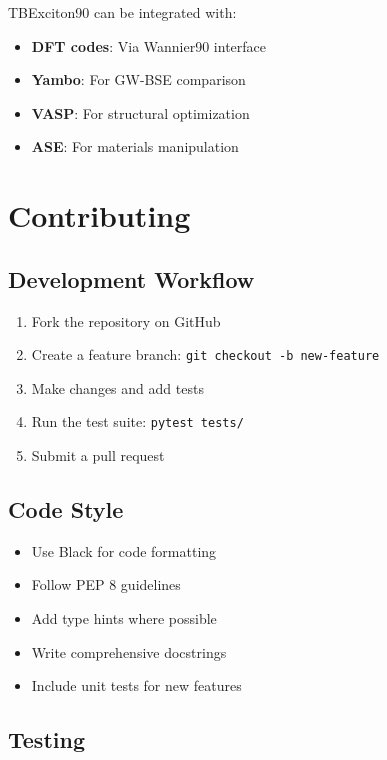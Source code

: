 \documentclass[11pt,a4paper]{article}
\newcommand{\code}[1]{\texttt{#1}}
\begin{document}
TBExciton90 can be integrated with:

\begin{itemize}
    \item \textbf{DFT codes}: Via Wannier90 interface
    \item \textbf{Yambo}: For GW-BSE comparison
    \item \textbf{VASP}: For structural optimization
    \item \textbf{ASE}: For materials manipulation
\end{itemize}

\section{Contributing}

\subsection{Development Workflow}

\begin{enumerate}
    \item Fork the repository on GitHub
    \item Create a feature branch: \code{git checkout -b new-feature}
    \item Make changes and add tests
    \item Run the test suite: \code{pytest tests/}
    \item Submit a pull request
\end{enumerate}

\subsection{Code Style}

\begin{itemize}
    \item Use Black for code formatting
    \item Follow PEP 8 guidelines
    \item Add type hints where possible
    \item Write comprehensive docstrings
    \item Include unit tests for new features
\end{itemize}

\subsection{Testing}
\end{document}
